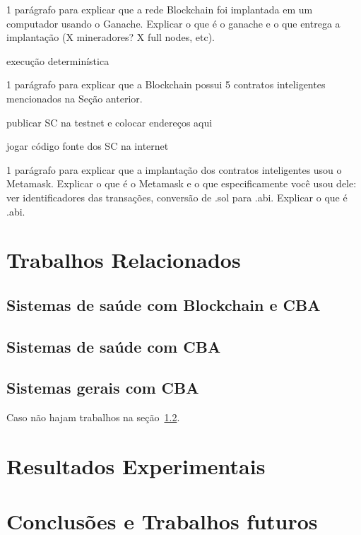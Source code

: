 \documentclass[a4paper,11pt]{article}
\begin{document}
{\color{Magenta} 1 parágrafo para explicar que a rede Blockchain foi implantada em um computador usando o Ganache. Explicar o que é o ganache e o que entrega a implantação (X mineradores? X full nodes, etc).}

execução determinística

{\color{Magenta} 1 parágrafo para explicar que a Blockchain possui 5 contratos inteligentes mencionados na Seção anterior.}

publicar SC na testnet e colocar endereços aqui

jogar código fonte dos SC na internet

{\color{Magenta} 1 parágrafo para explicar que a implantação dos contratos inteligentes usou o Metamask. Explicar o que é o Metamask e o que especificamente você usou dele: ver identificadores das transações, conversão de .sol para .abi. Explicar o que é .abi.}

\newpage
\section{Trabalhos Relacionados}

\subsection{Sistemas de saúde com Blockchain e CBA}

\subsection{Sistemas de saúde com CBA}
\label{sub:sec:saude-cba}

\subsection{Sistemas gerais com CBA}

Caso não hajam trabalhos na seção~\ref{sub:sec:saude-cba}.

\newpage
\section{Resultados Experimentais}



\newpage
\section{Conclusões e Trabalhos futuros}
\end{document}
